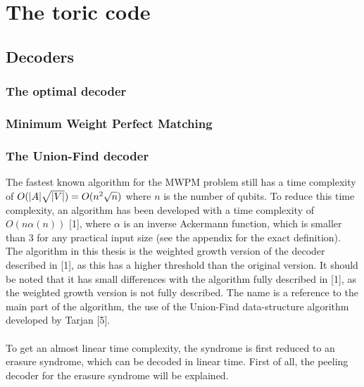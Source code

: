
\chapter{The toric code}

\section{Decoders}
\subsection{The optimal decoder}
\subsection{Minimum Weight Perfect Matching}
\subsection{The Union-Find decoder}
The fastest known algorithm for the MWPM problem still has a time complexity of $O(\abs{A}\sqrt{\abs{V}}) = O(n^2\sqrt{n})$ where $n$ is the number of qubits. To reduce this time complexity, an algorithm has been developed with a time complexity of $O(n\alpha(n))$ [1], where $\alpha$ is an inverse Ackermann function, which is smaller than 3 for any practical input size (see the appendix for the exact definition). The algorithm in this thesis is the weighted growth version of the decoder described in [1], as this has a higher threshold than the original version. It should be noted that it has small differences with the algorithm fully described in [1], as the weighted growth version is not fully described. The name is a reference to the main part of the algorithm, the use of the Union-Find data-structure algorithm developed by Tarjan [5].
\\\\
To get an almost linear time complexity, the syndrome is first reduced to an erasure syndrome, which can be decoded in linear time. First of all, the peeling decoder for the erasure syndrome will be explained. 
